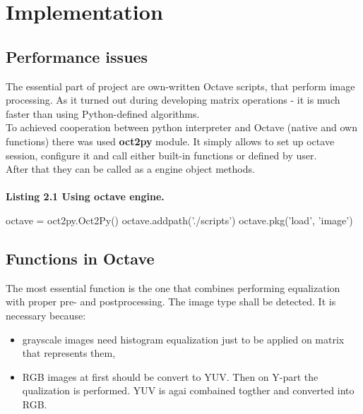 \documentclass[eng,openany]{mgr}
\begin{document}
\chapter{Implementation}
\section{Performance issues}
The essential part of project are own-written Octave scripts, that perform image processing. As it turned out during developing matrix operations - it is much faster than using Python-defined algorithms.\\
To achieved cooperation between python interpreter and Octave (native and own functions) there was used \textbf{oct2py} module.
It simply allows to set up octave session, configure it and call either built-in functions or defined by user.\\
After that they can be called as a engine object methods.
\\
\\
\textbf{Listing 2.1 Using octave engine.}
\begin{python}
        octave = oct2py.Oct2Py()
        octave.addpath('./scripts')
        octave.pkg('load', 'image')
\end{python}
\section{Functions in Octave}
The most essential function is the one that combines performing equalization with proper pre- and postprocessing. The image type shall be detected. It is necessary because:
\begin{itemize}
\item grayscale images need histogram equalization just to be applied on matrix that represents them,
\item RGB images at first should be convert to YUV. Then on Y-part the qualization is performed. YUV is agai combained togther and converted into RGB.
\end{itemize}
\end{document}

